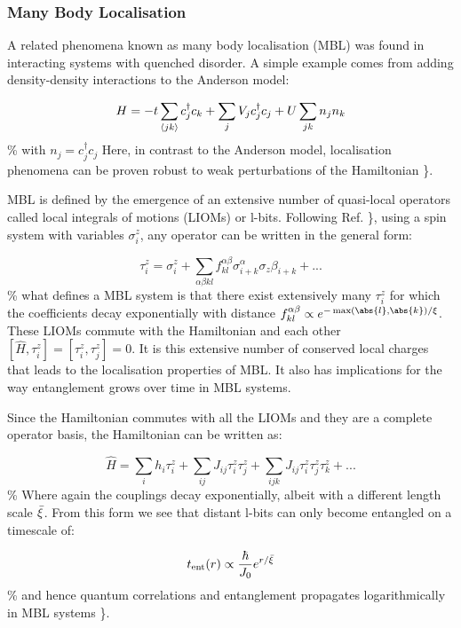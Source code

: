 \hypertarget{many-body-localisation}{%
\subsubsection{Many Body Localisation}\label{many-body-localisation}}

A related phenomena known as many body localisation (MBL) was found in interacting systems with quenched disorder. A simple example comes from adding density-density interactions to the Anderson model:

\[
H = -t\sum_{\langle jk \rangle} c^\dagger_j c_k + \sum_j V_j c_j^\dagger c_j + U\sum_{jk} n_j n_k
\] \% with \(n_j = c^\dagger_j c_j\) Here, in contrast to the Anderson model, localisation phenomena can be proven robust to weak perturbations of the Hamiltonian \textcite{imbrie_many-body_2016}\}.

MBL is defined by the emergence of an extensive number of quasi-local operators called local integrals of motions (LIOMs) or l-bits. Following Ref. \textcite{abanin_recent_2017}\}, using a spin system with variables \(\sigma^z_i\), any operator can be written in the general form:

\[ \tau^z_i = \sigma^z_i + \sum_{\alpha\beta kl} f_{kl}^{\alpha\beta} \sigma^\alpha_{i+k} \sigma_z\beta_{i+k} + ...\] \% what defines a MBL system is that there exist extensively many \(\tau^z_i\) for which the coefficients decay exponentially with distance \(f_{kl}^{\alpha\beta} \propto e^{-\max(\abs{l},\abs{k}) / \xi}\). These LIOMs commute with the Hamiltonian and each other \([\hat{H}, \tau^z_i] = [\tau^z_i, \tau^z_j] = 0\). It is this extensive number of conserved local charges that leads to the localisation properties of MBL. It also has implications for the way entanglement grows over time in MBL systems.

Since the Hamiltonian commutes with all the LIOMs and they are a complete operator basis, the Hamiltonian can be written as:

\[\hat{H} = \sum_{i} h_i \tau^z_i + \sum_{ij} J_{ij} \tau^z_i \tau^z_j + \sum_{ijk} J_{ij} \tau^z_i \tau^z_j \tau^z_k+ ...\] \% Where again the couplings decay exponentially, albeit with a different length scale \(\Bar{\xi}\). From this form we see that distant l-bits can only become entangled on a timescale of:

\[ t_{\mathrm{ent}}(r) \propto \frac{\hbar}{J_0} e^{r/\Bar{\xi}} \] \% and hence quantum correlations and entanglement propagates logarithmically in MBL systems \textcite{imbrie_diagonalization_2016}\}.

